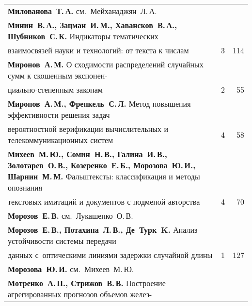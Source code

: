 {\begin{tabular}{p{388pt}rr}
\textbf{Милованова~Т.\,А.} см.\ Мейханаджян~Л.\,А.&&\\
\textbf{Минин~В.\,А., Зацман~И.\,М., Хавансков~В.\,А., Шубников~С.\,К.} Индикаторы
тематических\linebreak
\vspace*{-12pt}\\
\hspace*{23pt}взаимосвязей науки и технологий: от текста к числам\dotfill&3&114\\
\textbf{Миронов~А.\,М.} О сходимости распределений случайных сумм к скошенным
экс\-по\-нен-\linebreak
\vspace*{-12pt}\\
\hspace*{23pt}ци\-аль\-но-степенным законам\dotfill&2&55\\
\textbf{Миронов~А.\,М., Френкель~С.\,Л.} Метод повышения эффективности решения
задач\linebreak
\vspace*{-12pt}\\
\hspace*{23pt}вероятностной верификации вычислительных и телекоммуникационных
систем\dotfill&4&58\\
\hangindent=23pt\noindent\textbf{Михеев~М.\,Ю., Сомин~Н.\,В., Галина~И.\,В., 
Золотарев~О.\,В., Козеренко~Е.\,Б., Морозова~Ю.\,И., Шарнин~М.\,М.} Фальштексты: 
классификация и методы опознания\linebreak
\vspace*{-12pt}\\
\hspace*{23pt}текс\-то\-вых имитаций и документов с подменой авторства\dotfill&4&70\\
\textbf{Морозов~Е.\,В.} см.\ Лукашенко~О.\,В.&&\\
\textbf{Морозов~Е.\,В., Потахина~Л.\,В., Де~Турк~K.} Анализ устойчивости системы
передачи\linebreak
\vspace*{-12pt}\\
\hspace*{23pt}данных с~оптическими линиями задержки случайной длины\dotfill&1&127\\
\textbf{Морозова~Ю.\,И.} см.\ Михеев~М.\,Ю.&&\\
\textbf{Мотренко~А.\,П., Стрижов~В.\,В.} Построение агрегированных прогнозов объемов
желез-\linebreak
\vspace*{-12pt}\\

\end{tabular}}
